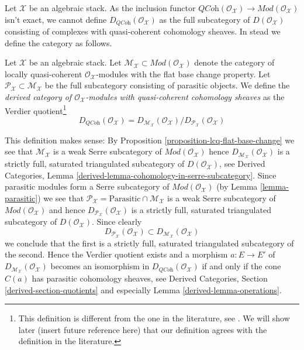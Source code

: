 \noindent
Let $\mathcal{X}$ be an algebraic stack. As the inclusion functor
$\textit{QCoh}(\mathcal{O}_\mathcal{X}) \to
\textit{Mod}(\mathcal{O}_\mathcal{X})$ isn't exact, we cannot define
$D_{\textit{QCoh}}(\mathcal{O}_\mathcal{X})$ as the full subcategory
of $D(\mathcal{O}_\mathcal{X})$ consisting of complexes with quasi-coherent
cohomology sheaves. In stead we define the category as follows.

\begin{definition}
\label{definition-derived}
Let $\mathcal{X}$ be an algebraic stack. Let
$\mathcal{M}_\mathcal{X} \subset \textit{Mod}(\mathcal{O}_\mathcal{X})$
denote the category of locally quasi-coherent
$\mathcal{O}_\mathcal{X}$-modules with the flat base change property.
Let $\mathcal{P}_\mathcal{X} \subset \mathcal{M}_\mathcal{X}$
be the full subcategory consisting of parasitic objects.
We define the {\it derived category of $\mathcal{O}_\mathcal{X}$-modules with
quasi-coherent cohomology sheaves} as the Verdier quotient\footnote{This
definition is different from the one in the literature, see
\cite[6.3]{olsson_sheaves}. We will show later (insert future reference
here) that our definition
agrees with the definition in the literature.}
$$
D_{\textit{QCoh}}(\mathcal{O}_\mathcal{X}) =
D_{\mathcal{M}_\mathcal{X}}(\mathcal{O}_\mathcal{X})/
D_{\mathcal{P}_\mathcal{X}}(\mathcal{O}_\mathcal{X})
$$
\end{definition}

\noindent
This definition makes sense: By
Proposition \ref{proposition-lcq-flat-base-change}
we see that $\mathcal{M}_\mathcal{X}$ is a weak Serre subcategory
of $\textit{Mod}(\mathcal{O}_\mathcal{X})$
hence $D_{\mathcal{M}_\mathcal{X}}(\mathcal{O}_\mathcal{X})$
is a strictly full, saturated triangulated subcategory of
$D(\mathcal{O}_\mathcal{X})$, see
Derived Categories, Lemma \ref{derived-lemma-cohomology-in-serre-subcategory}.
Since parasitic modules form a Serre subcategory of
$\textit{Mod}(\mathcal{O}_\mathcal{X})$ (by
Lemma \ref{lemma-parasitic}) we see that
$\mathcal{P}_\mathcal{X} = \text{Parasitic} \cap \mathcal{M}_\mathcal{X}$
is a weak Serre subcategory of $\textit{Mod}(\mathcal{O}_\mathcal{X})$ and
hence $D_{\mathcal{P}_\mathcal{X}}(\mathcal{O}_\mathcal{X})$
is a strictly full, saturated triangulated subcategory of
$D(\mathcal{O}_\mathcal{X})$. Since clearly
$$
D_{\mathcal{P}_\mathcal{X}}(\mathcal{O}_\mathcal{X})
\subset
D_{\mathcal{M}_\mathcal{X}}(\mathcal{O}_\mathcal{X})
$$
we conclude that the first is a strictly full, saturated triangulated
subcategory of the second. Hence the Verdier quotient exists and
a morphism $a : E \to E'$ of
$D_{\mathcal{M}_\mathcal{X}}(\mathcal{O}_\mathcal{X})$ becomes an
isomorphism in $D_{\textit{QCoh}}(\mathcal{O}_\mathcal{X})$ if and
only if the cone $C(a)$ has parasitic cohomology sheaves, see
Derived Categories, Section \ref{derived-section-quotients} and especially
Lemma \ref{derived-lemma-operations}.


